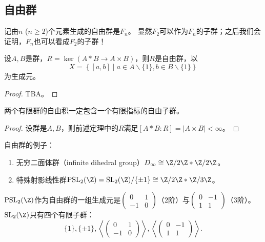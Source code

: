 \subsection{自由群}
记由$n$ ($n \geqslant 2$)个元素生成的自由群是$F_n$。
显然$F_2$可以作为$F_n$的子群；之后我们会证明，$F_n$也可以看成$F_2$的子群！
\begin{proposition}
    设$A,B$是群，$R = \ker(A*B \to A \times B)$，则$R$是自由群，以\[X = \left\{ [a,b] \mid a \in A\backslash\{1\},b \in B\backslash \{1\} \right\}\]
    为生成元。
\end{proposition}
\begin{proof}
    TBA。
\end{proof}
\begin{corollary}
    两个有限群的自由积一定包含一个有限指标的自由子群。
\end{corollary}
\begin{proof}
    设群是$A,B$，则前述定理中的$R$满足$[A*B:R] = |A \times B| < \infty$。
\end{proof}
\begin{example}
    自由群的例子：
    \begin{enumerate}
        \item 无穷二面体群（infinite dihedral group）$D_\infty \cong \Z/2\Z * \Z/2\Z$。
        \item 特殊射影线性群$\operatorname{PSL}_2(\Z) = \operatorname{SL}_2(\Z)/\{\pm 1\} \cong \Z/2\Z * \Z/3\Z$。
    \end{enumerate}
\end{example}
\begin{remark}
    $\operatorname{PSL}_2(\Z)$作为自由群的一组生成元是$\begin{pmatrix}
        0 & 1\\ -1 & 0
    \end{pmatrix}$（$2$阶）与$\begin{pmatrix}
        0 & -1\\ 1 & 1
    \end{pmatrix}$（$3$阶）。$\operatorname{SL}_2(\Z)$只有四个有限子群：
    \[\{1\},\{\pm 1\},\left\langle \begin{pmatrix}
        0 & 1\\ -1 & 0
    \end{pmatrix} \right\rangle,\left\langle \begin{pmatrix}
        0 & -1\\ 1 & 1
    \end{pmatrix} \right\rangle.\]
\end{remark}
